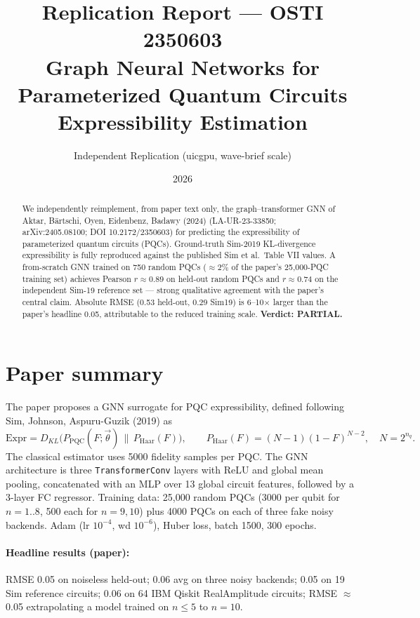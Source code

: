 \documentclass[11pt]{article}
\title{Replication Report --- OSTI 2350603\\
\large Graph Neural Networks for Parameterized Quantum Circuits Expressibility Estimation}
\author{Independent Replication (uicgpu, wave-brief scale)}
\date{2026}
\begin{document}
\maketitle

\begin{abstract}
We independently reimplement, from paper text only, the graph--transformer
GNN of Aktar, B\"artschi, Oyen, Eidenbenz, Badawy (2024)
(LA-UR-23-33850; arXiv:2405.08100; DOI 10.2172/2350603) for predicting the
expressibility of parameterized quantum circuits (PQCs). Ground-truth
Sim-2019 KL-divergence expressibility is fully reproduced against the
published Sim et al.\ Table VII values. A from-scratch GNN trained on
750 random PQCs (\(\approx 2\%\) of the paper's 25{,}000-PQC training set)
achieves Pearson \(r \approx 0.89\) on held-out random PQCs and
\(r \approx 0.74\) on the independent Sim-19 reference set --- strong
qualitative agreement with the paper's central claim. Absolute
RMSE (0.53 held-out, 0.29 Sim19) is 6--10\(\times\) larger than the
paper's headline 0.05, attributable to the reduced training scale.
\textbf{Verdict: PARTIAL.}
\end{abstract}

\section{Paper summary}
The paper proposes a GNN surrogate for PQC expressibility, defined
following Sim, Johnson, Aspuru-Guzik (2019) as
\[
\mathrm{Expr} = D_{KL}\bigl(P_{\mathrm{PQC}}(F;\vec\theta)\,\|\,P_{\mathrm{Haar}}(F)\bigr),
\qquad P_{\mathrm{Haar}}(F) = (N-1)(1-F)^{N-2},\quad N = 2^{n_q}.
\]
The classical estimator uses 5000 fidelity samples per PQC. The GNN
architecture is three \texttt{TransformerConv} layers with ReLU and
global mean pooling, concatenated with an MLP over 13 global circuit
features, followed by a 3-layer FC regressor. Training data: 25{,}000
random PQCs (3000 per qubit for \(n\!=\!1..8\), 500 each for \(n\!=\!9,10\))
plus 4000 PQCs on each of three fake noisy backends. Adam
(lr \(10^{-4}\), wd \(10^{-6}\)), Huber loss, batch 1500, 300 epochs.

\paragraph{Headline results (paper):} RMSE 0.05 on noiseless held-out;
0.06 avg on three noisy backends; 0.05 on 19 Sim reference circuits;
0.06 on 64 IBM Qiskit RealAmplitude circuits; RMSE \(\approx\) 0.05
extrapolating a model trained on \(n\!\le\!5\) to \(n\!=\!10\).
\end{document}
